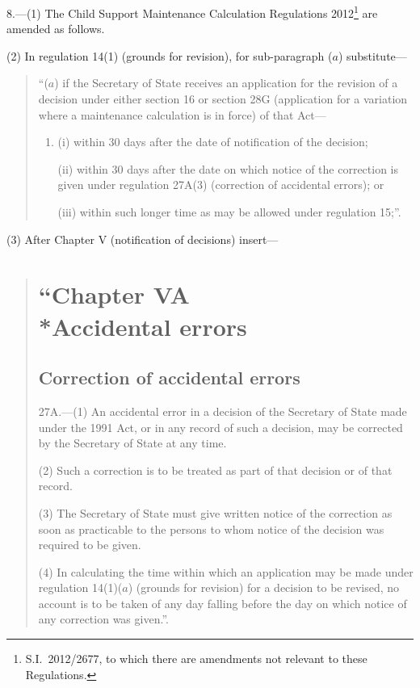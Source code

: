 \documentclass[12pt,a4paper]{article}
\begin{document}
8.—(1) The Child Support Maintenance Calculation Regulations 2012\footnote{S.I.~2012/2677, to which there are amendments not relevant to these Regulations.} are amended as follows.

(2) In regulation 14(1) (grounds for revision), for sub-paragraph ($a$)  substitute—
\begin{quotation}
“($a$) if the Secretary of State receives an application for the revision of a decision under either section 16 or section 28G (application for a variation where a maintenance calculation is in force) of that Act—
\begin{enumerate}\item[]
(i) within 30 days after the date of notification of the decision;

(ii) within 30 days after the date on which notice of the correction is given under regulation 27A(3) (correction of accidental errors); or

(iii) within such longer time as may be allowed under regulation 15;”.
\end{enumerate}
\end{quotation}

(3) After Chapter V (notification of decisions) insert—
\begin{quotation}
\section*{“Chapter VA\\*Accidental errors}

\subsection*{Correction of accidental errors}

27A.—(1) An accidental error in a decision of the Secretary of State made under the 1991 Act, or in any record of such a decision, may be corrected by the Secretary of State at any time.

(2) Such a correction is to be treated as part of that decision or of that record.

(3) The Secretary of State must give written notice of the correction as soon as practicable to the persons to whom notice of the decision was required to be given.

(4) In calculating the time within which an application may be made under regulation 14(1)($a$)  (grounds for revision) for a decision to be revised, no account is to be taken of any day falling before the day on which notice of any correction was given.”.
\end{quotation}
\end{document}

